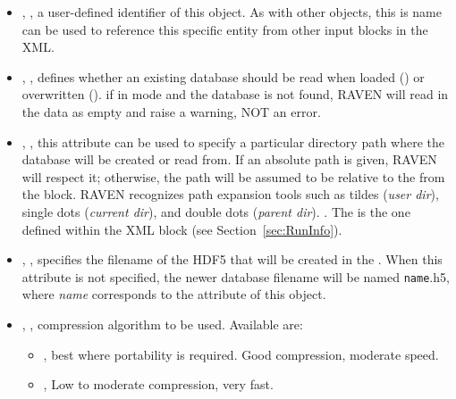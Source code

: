 \begin{itemize}
  \itemsep0em
  \item {}, , a user-defined
  identifier of this object.
  \nb As with other objects, this is name can be used to reference this specific
  entity from other input blocks in the XML.
  \item {}, , defines whether an existing database should
    be read when loaded () or overwritten ().
    \nb if in  mode and the database is not found, RAVEN will read in
    the data as empty and raise a warning, NOT an error.
  \item {}, , this attribute
  can be used to specify a particular directory path where the database will be
  created or read from.  If an absolute path is given, RAVEN will respect it; otherwise,
  the path will be assumed to be relative to the  from the  block.
  RAVEN recognizes path expansion tools such as tildes (\emph{user dir}), single dots (\emph{current dir}),
  and double dots (\emph{parent dir}).
  .  The  is
   the one defined within the  XML block (see Section~\ref{sec:RunInfo}).
  \item {}, , specifies the
  filename of the HDF5 that will be created in the .
  \nb When this attribute is not specified, the newer database filename will be
  named \texttt{name}.h5, where \textit{name} corresponds to the 
  attribute of this object.
  \item {}, , compression
  algorithm to be used.
  Available are:
  \begin{itemize}
    \item {}, best where portability is required.
    Good compression, moderate speed.
    \item {}, Low to moderate compression, very fast.
  \end{itemize}
\end{itemize}

